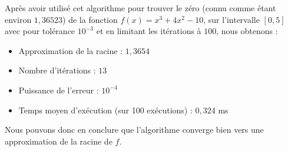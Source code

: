 \documentclass[12pt]{article}
\begin{document}
\noindent Après avoir utilisé cet algorithme pour trouver le zéro (connu comme étant environ $1,36523$) de la fonction $f(x) = x^3 + 4x^2 -10$, sur l'intervalle $[0,5]$ avec pour tolérance $10^{-3}$ et en limitant les itérations à $100$, nous obtenons :
\begin{itemize}
    \item Approximation de la racine : $1,3654$
    \item Nombre d'itérations : $13$
    \item Puissance de l'erreur : $10^{-4}$
    \item Temps moyen d'exécution (sur 100 exécutions) : $0,324$ ms
\end{itemize}
Nous pouvons donc en conclure que l'algorithme converge bien vers une approximation de la racine de $f$.

\end{document}
